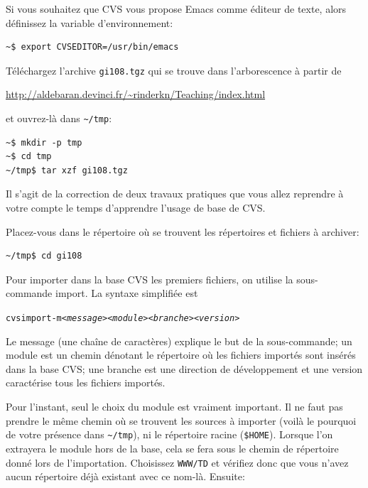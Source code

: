 \documentclass[11pt,a4paper]{article}
\begin{document}
\bigskip

\noindent Si vous souhaitez que CVS vous propose Emacs comme éditeur
de texte, alors définissez la variable d'environnement:

{\small
\begin{verbatim}
~$ export CVSEDITOR=/usr/bin/emacs
\end{verbatim}
}

\noindent
Téléchargez l'archive \texttt{gi108.tgz} qui se trouve dans
l'arborescence à partir de

\url{http://aldebaran.devinci.fr/~rinderkn/Teaching/index.html}

\noindent
et ouvrez-là dans \verb|~/tmp|:

{\small
\begin{verbatim}
~$ mkdir -p tmp
~$ cd tmp
~/tmp$ tar xzf gi108.tgz
\end{verbatim}
}

\noindent Il s'agit de la correction de deux travaux pratiques que
vous allez reprendre à votre compte le temps d'apprendre l'usage de
base de CVS.

\bigskip

\noindent Placez-vous dans le répertoire où se trouvent les
répertoires et fichiers à archiver:

{\small
\begin{verbatim}
~/tmp$ cd gi108
\end{verbatim}
}

Pour importer dans la base CVS les premiers fichiers, on utilise la
sous-commande \textsf{import}. La syntaxe simplifiée est

{\small
\begin{alltt}
  cvs import -m \textsf{\emph{<message> <module> <branche> <version>}}
\end{alltt}
}

Le message (une chaîne de caractères) explique le but de la sous-commande;
un module est un chemin dénotant le répertoire où les fichiers
importés sont insérés dans la base CVS; une branche est une direction
de développement et une version caractérise tous les fichiers
importés.

\bigskip

Pour l'instant, seul le choix du module est vraiment important. Il ne
faut pas prendre le même chemin où se trouvent les sources à importer
(voilà le pourquoi de votre présence dans \verb|~/tmp|), ni le
répertoire racine (\verb|$HOME|). Lorsque l'on extrayera le module
hors de la base, cela se fera sous le chemin de répertoire donné lors
de l'importation. Choisissez \verb|WWW/TD| et vérifiez donc que vous
n'avez aucun répertoire déjà existant avec ce nom-là. Ensuite:
\end{document}
